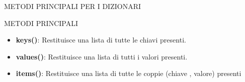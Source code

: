 \documentclass[aspectratio=1610]{beamer}
\begin{document}
\begin{frame}{METODI PRINCIPALI PER I DIZIONARI}
    \begin{alertblock}{METODI PRINCIPALI}
        \begin{minipage}{0.98\linewidth}
            \justifying
            \begin{itemize}
                \item \textbf{keys()}: Restituisce una lista di tutte le chiavi presenti. 
                \pause
                \item \textbf{values()}: Restituisce una lista di tutti i valori presenti.
                \pause
                \item \textbf{items()}: Restituisce una lista di tutte le coppie (chiave , valore) presenti
            \end{itemize}
        \end{minipage}
    \end{alertblock}
\end{frame}
\end{document}
